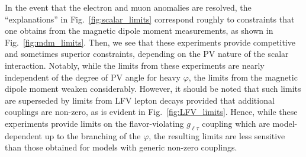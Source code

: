 In the event that the electron and muon anomalies are resolved, the ``explanations'' in Fig.~\ref{fig:scalar_limits} correspond roughly to constraints that one obtains from the magnetic dipole moment measurements, as shown in Fig.~\ref{fig:mdm_limits}. Then, we see that these experiments provide competitive and sometimes superior constraints, depending on the PV nature of the scalar interaction. Notably, while the limits from these experiments are nearly independent of the degree of PV angle for heavy $\varphi$, the limits from the magnetic dipole moment weaken considerably. However, it should be noted that such limits are superseded by limits from LFV lepton decays provided that additional couplings are non-zero, as is evident in Fig.~\ref{fig:LFV_limits}. Hence, while these experiments provide limits on the flavor-violating $g_{\ell\tau}$ coupling which are model-dependent up to the branching of the $\varphi$, the resulting limits are less sensitive than those obtained for models with generic non-zero couplings.
